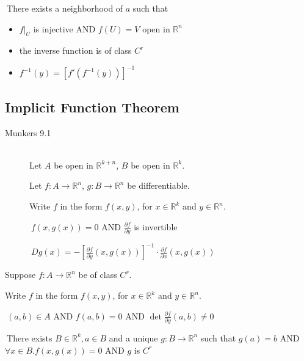 \thmTHEN
	$\ $There exists a neighborhood of $a$ such that
\begin{itemize}
	\item $f|_U$ is injective AND $f(U)=V$ open in $\mathbb{R}^n$
	\item the inverse function is of class $C^r$
	\item $f^{-1}(y)=[f'(f^{-1}(y))]^{-1}$
\end{itemize}


\subsection{Implicit Function Theorem}
\label{thm_ipft}
\begin{description}
	\item[Munkers 9.1] \hfill \\
		Let $A$ be open in $\mathbb{R}^{k+n}$, $B$ be open in $\mathbb{R}^k$.
		
		Let $f:A\to \mathbb{R}^n$, $g:B\to \mathbb{R}^n$ be differentiable.
		
		Write $f$ in the form $f(x, y)$, for $x\in \mathbb{R}^k$ and $y\in \mathbb{R}^n$.
		
		\thmIF $\ f(x, g(x))=0$ AND $\frac{\partial f}{\partial y}$ is invertible
		
		\thmTHEN $\ Dg(x)=-\left[\frac{\partial f}{\partial y}(x,g(x))\right]^{-1}\cdot \frac{\partial f}{\partial x}(x,g(x))$
\end{description}

Suppose $f:A\to \mathbb{R}^n$ be of class $C^r$.

Write $f$ in the form $f(x, y)$, for $x\in \mathbb{R}^k$ and $y\in \mathbb{R}^n$.

\thmIF $\ (a, b)\in A$ AND $f(a, b)=0$ AND $\det \frac{\partial f}{\partial y}(a,b)\neq 0$

\thmTHEN $\ $There exists $B\in \mathbb{R}^k, a \in B$ and a unique $g:B\to \mathbb{R}^n$ such that
		$g(a)=b$ AND $\forall x\in B. f(x,g(x))=0$ AND $g$ is $C^r$